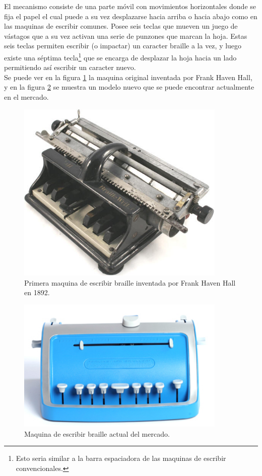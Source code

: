 El mecanismo consiste de una parte m\'ovil con movimientos horizontales donde
se
fija el papel el cual puede a su vez desplazarse hacia arriba o hacia abajo
como en las maquinas de escribir comunes. Posee seis teclas que mueven un
juego de v\'astagos que a su vez activan una serie de punzones que marcan la
hoja. Estas seis teclas permiten escribir (o impactar) un caracter braille a
la vez, y luego existe una s\'eptima tecla\footnote{Esto seria similar a la
barra espaciadora de las maquinas de escribir convencionales.} que se encarga
de
desplazar la hoja hacia un lado permitiendo as\'i escribir un caracter nuevo.\\

Se puede ver en la figura \ref{fig:hallbraille-03} la maquina original
inventada por Frank Haven Hall, y en la figura
\ref{fig:ng_perkinsaph_brailler} se muestra un modelo nuevo que se puede
encontrar actualmente en el mercado.

\begin{figure}[htp]
\centering
\includegraphics[width=10cm]{./img/hallbraille-03.png}
\caption{Primera maquina de escribir braille inventada por Frank Haven Hall
en 1892.}
\label{fig:hallbraille-03}
\end{figure}

\begin{figure}[htp]
\centering
\includegraphics[width=10cm]{./img/ng_perkinsaph_brailler.png}
\caption{Maquina de escribir braille actual del mercado.}
\label{fig:ng_perkinsaph_brailler}
\end{figure}

